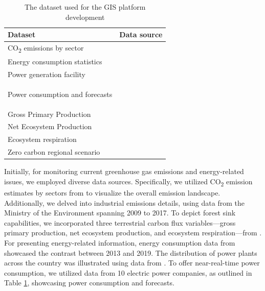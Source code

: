 \begin{table}[!ht]
    \centering
    \caption{The dataset used for the GIS platform development}
    \begin{adjustbox}{width=\textwidth}
        \begin{tabular}{l l}
        \hline
            Dataset & Data source \\ \hline
            CO\textsubscript{2} emissions by sector & \citep{env2022} \\ \hline
            Energy consumption statistics & \citep{Toshihiko} \\ \hline
            Power generation facility & \citep{nlftp} \\ \hline
            \multirow{10}{*}{Power consumption and forecasts} & \citep{hokkaido} \\
            ~ & \citep{tohoku} \\
            ~ & \citep{Tokyo} \\
            ~ & \citep{Chubu} \\
            ~ & \citep{Hokuriku} \\
            ~ & \citep{Kansai} \\
            ~ & \citep{Chugoku} \\
            ~ & \citep{Shikoku} \\
            ~ & \citep{Kyushu} \\
            ~ & \citep{Okinawa} \\ \hline
            Gross Primary Production & \multirow{3}{*}{\citep{ito2019disequilibrium}} \\
            Net Ecosystem Production & ~ \\
            Ecosystem respiration & ~ \\ \hline
            Zero carbon regional scenario & \citep{zerocarbon} \\
            \hline
        \end{tabular}
    \end{adjustbox}
    \label{tab:chap7_tab1}
\end{table}

Initially, for monitoring current greenhouse gas emissions and energy-related issues, we employed diverse data sources. Specifically, we utilized CO\textsubscript{2} emission estimates by sectors from \citep{env2022} to visualize the overall emission landscape. Additionally, we delved into industrial emissions details, using data from the Ministry of the Environment spanning 2009 to 2017. To depict forest sink capabilities, we incorporated three terrestrial carbon flux variables—gross primary production, net ecosystem production, and ecosystem respiration—from \citep{ito2019disequilibrium}. For presenting energy-related information, energy consumption data from \citep{Toshihiko} showcased the contrast between 2013 and 2019. The distribution of power plants across the country was illustrated using data from \citep{nlftp}. To offer near-real-time power consumption, we utilized data from 10 electric power companies, as outlined in Table \ref{tab:chap7_tab1}, showcasing power consumption and forecasts.\par

